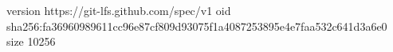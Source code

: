 version https://git-lfs.github.com/spec/v1
oid sha256:fa36960989611cc96e87cf809d93075f1a4087253895e4e7faa532c641d3a6e0
size 10256
